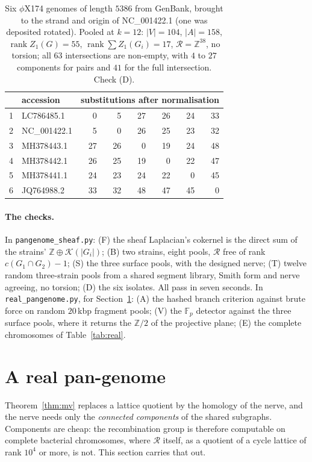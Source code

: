 \documentclass[11pt]{article}
\theoremstyle{plain}
\theoremstyle{definition}
\theoremstyle{remark}
\newcommand{\Z}{\mathbb{Z}}
\newcommand{\K}{\mathcal{K}}
\newcommand{\rank}{\operatorname{rank}}
\newcommand{\Rec}{\mathcal{R}}
\begin{document}
\begin{table}[t]
\centering
\small
\begin{tabular}{llrrrrrr}
\toprule
 & accession & \multicolumn{6}{c}{substitutions after normalisation}\\
\midrule
1 & LC786485.1 & 0 & 5 & 27 & 26 & 24 & 33\\
2 & NC\_001422.1 & 5 & 0 & 26 & 25 & 23 & 32\\
3 & MH378443.1 & 27 & 26 & 0 & 19 & 24 & 48\\
4 & MH378442.1 & 26 & 25 & 19 & 0 & 22 & 47\\
5 & MH378441.1 & 24 & 23 & 24 & 22 & 0 & 45\\
6 & JQ764988.2 & 33 & 32 & 48 & 47 & 45 & 0\\
\bottomrule
\end{tabular}
\caption{Six $\phi$X174 genomes of length $5386$ from GenBank, brought to the strand and
origin of NC\_001422.1 (one was deposited rotated). Pooled at $k=12$: $|V|=104$, $|A|=158$,
$\rank Z_1(G)=55$, $\rank\sum Z_1(G_i)=17$, $\Rec=\Z^{38}$, no torsion; all $63$
intersections are non-empty, with $4$ to $27$ components for pairs and $41$ for the full
intersection. Check (D).}
\label{tab:iso}
\end{table}

\paragraph{The checks.} In \texttt{pangenome\_sheaf.py}: (F) the sheaf Laplacian's cokernel is
the direct sum of the strains' $\Z\oplus\K(|G_i|)$; (B) two strains, eight pools, $\Rec$ free
of rank $c(G_1\cap G_2)-1$; (S) the three surface pools, with the designed nerve; (T) twelve
random three-strain pools from a shared segment library, Smith form and nerve agreeing, no
torsion; (D) the six isolates. All pass in seven seconds. In \texttt{real\_pangenome.py},
for Section~\ref{sec:real}: (A) the hashed branch criterion against brute force on random
$20$\,kbp fragment pools; (V) the $\mathbb F_p$ detector against the three surface pools,
where it returns the $\Z/2$ of the projective plane; (E) the complete chromosomes of
Table~\ref{tab:real}.

\section{A real pan-genome}\label{sec:real}

Theorem~\ref{thm:mv} replaces a lattice quotient by the homology of the nerve, and the nerve
needs only the \emph{connected components} of the shared subgraphs. Components are cheap:
the recombination group is therefore computable on complete bacterial chromosomes, where
$\Rec$ itself, as a quotient of a cycle lattice of rank $10^4$ or more, is not. This section
carries that out.
\end{document}
